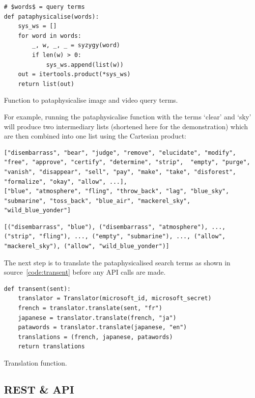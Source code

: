 \begin{listing}
  \begin{verbatim}
# $words$ = query terms
def pataphysicalise(words):
    sys_ws = []
    for word in words:
        _, w, _, _ = syzygy(word)
        if len(w) > 0:
            sys_ws.append(list(w))
    out = itertools.product(*sys_ws)
    return list(out)
  \end{verbatim}
\caption{Function to pataphysicalise image and video query terms.}
\label{code:pataph}
\end{listing}

For example, running the pataphysicalise function with the terms `clear' and `sky' will produce two intermediary lists (shortened here for the demonstration) which are then combined into one list using the Cartesian product:

\begin{verbatim}
["disembarrass", "bear", "judge", "remove", "elucidate", "modify", "free", "approve", "certify", "determine", "strip",  "empty", "purge", "vanish", "disappear", "sell", "pay", "make", "take", "disforest", "formalize", "okay", "allow", ...],
["blue", "atmosphere", "fling", "throw_back", "lag", "blue_sky", "submarine", "toss_back", "blue_air", "mackerel_sky", "wild_blue_yonder"]
\end{verbatim}
\begin{verbatim}
[("disembarrass", "blue"), ("disembarrass", "atmosphere"), ..., ("strip", "fling"), ..., ("empty", "submarine"), ..., ("allow", "mackerel_sky"), ("allow", "wild_blue_yonder")]
\end{verbatim}

The next step is to translate the pataphysicalised search terms as shown in source~\ref{code:transent} before any \ac{API} calls are made.

\begin{listing}
  \begin{verbatim}
def transent(sent):
    translator = Translator(microsoft_id, microsoft_secret)
    french = translator.translate(sent, "fr")
    japanese = translator.translate(french, "ja")
    patawords = translator.translate(japanese, "en")
    translations = (french, japanese, patawords)
    return translations
  \end{verbatim}
\caption{Translation function.}
\label{code:transent}
\end{listing}



\subsection{REST \& API}

